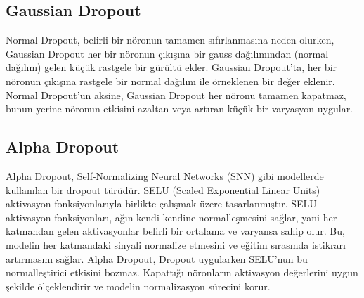\subsection{Gaussian Dropout}

Normal Dropout, belirli bir nöronun tamamen sıfırlanmasına neden olurken, Gaussian Dropout her bir nöronun çıkışına bir gauss dağılımından (normal dağılım) gelen küçük rastgele bir gürültü ekler. Gaussian Dropout'ta, her bir nöronun çıkışına rastgele bir normal dağılım ile örneklenen bir değer eklenir. Normal Dropout'un aksine, Gaussian Dropout her nöronu tamamen kapatmaz, bunun yerine nöronun etkisini azaltan veya artıran küçük bir varyasyon uygular.

\subsection{Alpha Dropout}

Alpha Dropout, Self-Normalizing Neural Networks (SNN) gibi modellerde kullanılan bir dropout türüdür. SELU (Scaled Exponential Linear Units) aktivasyon fonksiyonlarıyla birlikte çalışmak üzere tasarlanmıştır. SELU aktivasyon fonksiyonları, ağın kendi kendine normalleşmesini sağlar, yani her katmandan gelen aktivasyonlar belirli bir ortalama ve varyansa sahip olur. Bu, modelin her katmandaki sinyali normalize etmesini ve eğitim sırasında istikrarı artırmasını sağlar. Alpha Dropout, Dropout uygularken SELU'nun bu normalleştirici etkisini bozmaz. Kapattığı nöronların aktivasyon değerlerini uygun şekilde ölçeklendirir ve modelin normalizasyon sürecini korur.

\newpage